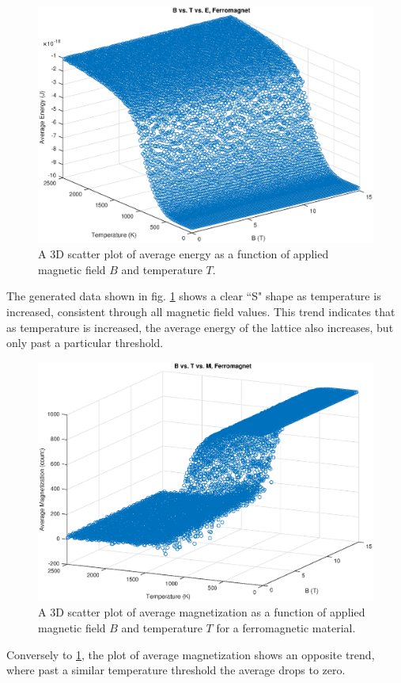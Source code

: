 \documentclass[12pt]{article}
\begin{document}
\begin{figure}[!h]
\includegraphics[width=\linewidth]{./Ferrographs/ferroEsurf.eps}
\caption{A 3D scatter plot of average energy as a function of applied magnetic field $B$ and temperature $T$.}
\label{ferroEsurf}
\end{figure}
The generated data shown in fig. \ref{ferroEsurf} shows a clear ``S" shape as temperature is increased, consistent through all magnetic field values.  This trend indicates that as temperature is increased, the average energy of the lattice also increases, but only past a particular threshold.

\begin{figure}[!h]
\includegraphics[width=\linewidth]{./Ferrographs/ferroMsurf.eps}
\caption{A 3D scatter plot of average magnetization as a function of applied magnetic field $B$ and temperature $T$ for a ferromagnetic material.}
\label{ferroMsurf}
\end{figure}
Conversely to \ref{ferroEsurf}, the plot of average magnetization shows an opposite trend, where past a similar temperature threshold the average drops to zero.
\end{document}
